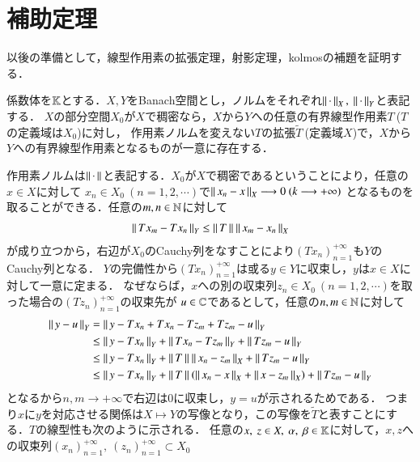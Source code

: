 \section{補助定理}
以後の準備として，線型作用素の拡張定理，射影定理，kolmosの補題を証明する．
\begin{itembox}[l]{}
	\begin{thm}[線型作用素の拡張]
		係数体を$\mathbb{K}$とする．$X,Y$をBanach空間とし，ノルムをそれぞれ$\Norm{\cdot}{X},\ \Norm{\cdot}{Y}$と表記する．
		$X$の部分空間$X_0$が$X$で稠密なら，$X$から$Y$への任意の有界線型作用素$T\ $($T$の定義域は$X_0$)に対し，
		作用素ノルムを変えない$T$の拡張$\tilde{T}\ $(定義域$X$)で，$X$から$Y$への有界線型作用素となるものが一意に存在する．
	\end{thm}
\end{itembox}
\begin{prf}
		作用素ノルムは$\left\|\, \cdot\, \right\|_{}$と表記する．$X_0$が$X$で稠密であるということにより，任意の$x \in X$に対して
		$x_n \in X_0 \ (n=1,2,\cdots)$で$\left\|\, x_n - x\, \right\|_{X} \longrightarrow 0\ (k \longrightarrow +\infty)$
		となるものを取ることができる．任意の$m,n \in \mathbb{N}$に対して
		\begin{align}
			\left\|\, Tx_m - Tx_n\, \right\|_{Y} \leq \left\|\, T\, \right\|_{} \left\|\, x_m - x_n\, \right\|_{X}
		\end{align}
		が成り立つから，右辺が$X_0$のCauchy列をなすことにより$(Tx_n)_{n=1}^{+\infty}$も$Y$のCauchy列となる．
		$Y$の完備性から$(Tx_n)_{n=1}^{+\infty}$は或る$y \in Y$に収束し，$y$は$x \in X$に対して一意に定まる．
		なぜならば，$x$への別の収束列$z_n \in X_0 \ (n=1,2,\cdots)$を取った場合の$(Tz_n)_{n=1}^{+\infty}$の収束先が
		$u \in \mathbb{C}$であるとして，任意の$n,m \in \mathbb{N}$に対して
		\begin{align}
			\left\|\, y - u\, \right\|_{Y} &= \left\|\, y - Tx_n + Tx_n - Tz_m + Tz_m - u\, \right\|_{Y} \\
			&\leq \left\|\, y - Tx_n\, \right\|_{Y} + \left\|\, Tx_n - Tz_m\, \right\|_{Y} + \left\|\, Tz_m - u\, \right\|_{Y} \\
			&\leq \left\|\, y - Tx_n\, \right\|_{Y} + \left\|\, T\, \right\|_{}\left\|\, x_n - z_m\, \right\|_{X} + \left\|\, Tz_m - u\, \right\|_{Y} \\
			&\leq \left\|\, y - Tx_n\, \right\|_{Y} + \left\|\, T\, \right\|_{}\left(\left\|\, x_n - x\, \right\|_{X} + \left\|\, x - z_m\, \right\|_{X}\right)+ \left\|\, Tz_m - u\, \right\|_{Y}
		\end{align}
		となるから$n,m \longrightarrow +\infty$で右辺は0に収束し，$y = u$が示されるためである．
		つまり$x$に$y$を対応させる関係は$X \longmapsto Y$の写像となり，この写像を$\tilde{T}$と表すことにする．$T$の線型性も次のように示される．
		任意の$x,\ z \in X,\ \alpha,\ \beta \in \mathbb{K}$に対して，$x,z$への収束列$(x_n)_{n=1}^{+\infty},\ (z_n)_{n=1}^{+\infty} \subset X_0$

\end{prf}
